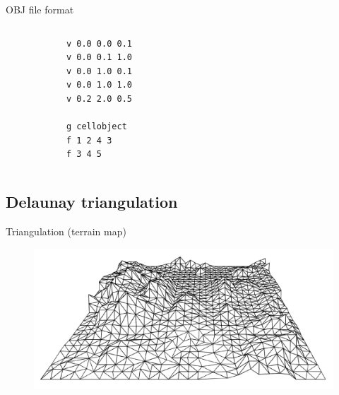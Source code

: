 \begin{frame}[fragile]{OBJ file format}
    \begin{columns}
            \begin{lstlisting}
            v 0.0 0.0 0.1
            v 0.0 0.1 1.0
            v 0.0 1.0 0.1
            v 0.0 1.0 1.0
            v 0.2 2.0 0.5
            
            g cellobject
            f 1 2 4 3
            f 3 4 5
            \end{lstlisting}
        \begin{figure}
            \centering
        \end{figure}
    \end{columns}
\end{frame}


\subsection{Delaunay triangulation}
\begin{frame}{Triangulation (terrain map)}
\begin{figure}
    \centering
    \includegraphics[width=\textwidth]{figs/L07-terrain-map.png}
\end{figure}

\end{frame}

